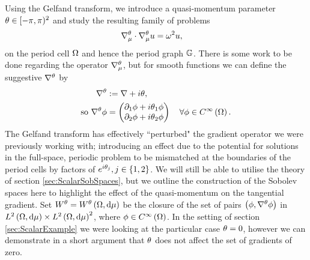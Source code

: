 Using the Gelfand transform, we introduce a quasi-momentum parameter $\theta\in[-\pi,\pi)^2$ and study the resulting family of problems
\begin{align*}
	\nabla_\mu^\theta \cdot \nabla_\mu^\theta u &= \omega^2 u,
\end{align*}
on the period cell $\Omega$ and hence the period graph $\mathbb{G}$.
There is some work to be done regarding the operator $\nabla_\mu^\theta$, but for smooth functions we can define the suggestive $\nabla^\theta$ by
\begin{align*}
	\nabla^\theta &:= \nabla + i\theta, \\
	\text{so } \nabla^\theta \phi &= \begin{pmatrix} \partial_1\phi + i\theta_1\phi \\ \partial_2\phi + i\theta_2\phi \end{pmatrix} \quad \forall\phi\in C^{\infty}\left( \Omega \right).
\end{align*}
The Gelfand transform has effectively ``perturbed" the gradient operator we were previously working with; introducing an effect due to the potential for solutions in the full-space, periodic problem to be mismatched at the boundaries of the period cells by factors of $e^{i\theta_j}, j\in\left\{ 1,2 \right\}$.
We will still be able to utilise the theory of section \ref{sec:ScalarSobSpaces}, but we outline the construction of the Sobolev spaces here to highlight the effect of the quasi-momentum on the tangential gradient.
Set $W^\theta=W^\theta\left( \Omega,\mathrm{d}\mu \right)$ be the closure of the set of pairs $\left( \phi,\nabla^\theta\phi \right)$ in $L^{2}\left( \Omega,\mathrm{d}\mu \right)\times L^{2}\left( \Omega,\mathrm{d}\mu \right)^2$, where $\phi\in C^{\infty}\left( \Omega \right)$.
In the setting of section \ref{sec:ScalarExample} we were looking at the particular case $\theta=0$, however we can demonstrate in a short argument that $\theta$ does not affect the set of gradients of zero.


